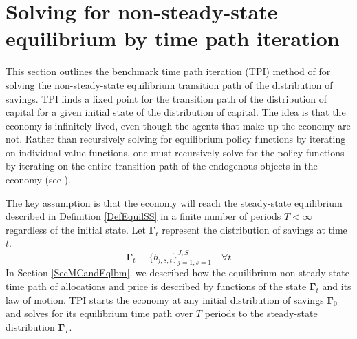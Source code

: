 \documentclass[letterpaper,12pt]{article}
\theoremstyle{definition}
\renewcommand\theenumi{\roman{enumi}}
\begin{document}
\newpage
\section{Solving for non-steady-state equilibrium by time path iteration}\label{AppNonSSsolve}

  \setcounter{equation}{0}
  \renewcommand\theenumi{\arabic{enumi}}
  \renewcommand\theenumii{\alph{enumii}}
  \renewcommand\theenumiii{\roman{enumiii}}

  This section outlines the benchmark time path iteration (TPI) method of \citet{AuerbachKotlikoff:1987} for solving the non-steady-state equilibrium transition path of the distribution of savings. TPI finds a fixed point for the transition path of the distribution of capital for a given initial state of the distribution of capital. The idea is that the economy is infinitely lived, even though the agents that make up the economy are not. Rather than recursively solving for equilibrium policy functions by iterating on individual value functions, one must recursively solve for the policy functions by iterating on the entire transition path of the endogenous objects in the economy (see \citet[ch. 17]{StokeyLucas:1989}).

  The key assumption is that the economy will reach the steady-state equilibrium described in Definition \ref{DefEquilSS} in a finite number of periods $T<\infty$ regardless of the initial state. Let $\bm{\Gamma}_t$ represent the distribution of savings at time $t$.
  \begin{equation}\label{EqSavDist}
    \bm{\Gamma}_t \equiv \{b_{j,s,t}\}_{j=1,s=1}^{J,S} \quad\forall t
  \end{equation}
  In Section \ref{SecMCandEqlbm}, we described how the equilibrium non-steady-state time path of allocations and price is described by functions of the state $\bm{\Gamma}_t$ and its law of motion. TPI starts the economy at any initial distribution of savings $\bm{\Gamma}_0$ and solves for its equilibrium time path over $T$ periods to the steady-state distribution $\bar{\bm{\Gamma}}_T$.
\end{document}
